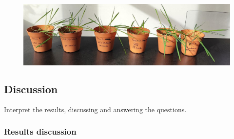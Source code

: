 \documentclass{article}
\newcommand{\cfig}[1]{%
  \begin{figure}[ht!]%
    \centering%
    #1%
  \end{figure}%
}
\begin{document}
\vspace*{2cm}
\cfig{\includegraphics[width=.9\textwidth]{media/plants-results.png}}

\newpage
\subsection{Discussion}
Interpret the results, discussing and answering the questions.

\subsubsection{Results discussion}
\end{document}

